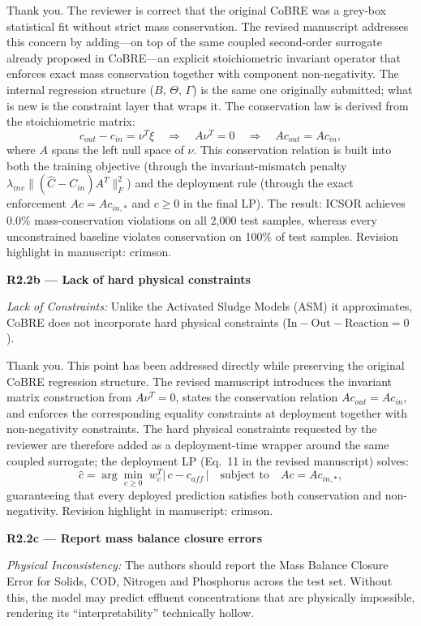 \documentclass[a4paper,11pt]{article}
\newcommand{\reviewlabel}[1]{\noindent\textbf{\textcolor{accentblue}{#1}}\par\medskip}
\newcommand{\revhighlight}[2]{\textcolor{#1}{Revision highlight in manuscript: #2.}}
\begin{document}
Thank you. The reviewer is correct that the original CoBRE was a grey-box statistical fit without strict mass conservation. The revised manuscript addresses this concern by adding---on top of the same coupled second-order surrogate already proposed in CoBRE---an explicit stoichiometric invariant operator that enforces exact mass conservation together with component non-negativity. The internal regression structure ($B$, $\Theta$, $\Gamma$) is the same one originally submitted; what is new is the constraint layer that wraps it. The conservation law is derived from the stoichiometric matrix:
\[
c_{out} - c_{in} = \nu^T \xi \quad\Longrightarrow\quad A\nu^T = 0 \quad\Longrightarrow\quad Ac_{out} = Ac_{in},
\]
where $A$ spans the left null space of $\nu$. This conservation relation is built into both the training objective (through the invariant-mismatch penalty $\lambda_{inv}\|(\widehat{C} - C_{in})A^T\|_F^2$) and the deployment rule (through the exact enforcement $Ac = Ac_{in,*}$ and $c \ge 0$ in the final LP). The result: ICSOR achieves 0.0\% mass-conservation violations on all 2,000 test samples, whereas every unconstrained baseline violates conservation on 100\% of test samples. \revhighlight{revRtwoTwo}{crimson}

\reviewlabel{R2.2b --- Lack of hard physical constraints}
\begin{reviewbox}
\textit{Lack of Constraints:} Unlike the Activated Sludge Models (ASM) it approximates, CoBRE does not incorporate hard physical constraints ($\mathrm{In} - \mathrm{Out} - \mathrm{Reaction} = 0$).
\end{reviewbox}

Thank you. This point has been addressed directly while preserving the original CoBRE regression structure. The revised manuscript introduces the invariant matrix construction from $A\nu^T = 0$, states the conservation relation $Ac_{out} = Ac_{in}$, and enforces the corresponding equality constraints at deployment together with non-negativity constraints. The hard physical constraints requested by the reviewer are therefore added as a deployment-time wrapper around the same coupled surrogate; the deployment LP (Eq.~11 in the revised manuscript) solves:
\[
\hat{c} = \arg\min_{c \ge 0} \; w_c^T |\,c - c_{aff}\,| \quad \text{subject to} \quad Ac = Ac_{in,*},
\]
guaranteeing that every deployed prediction satisfies both conservation and non-negativity. \revhighlight{revRtwoTwo}{crimson}

\reviewlabel{R2.2c --- Report mass balance closure errors}
\begin{reviewbox}
\textit{Physical Inconsistency:} The authors should report the Mass Balance Closure Error for Solids, COD, Nitrogen and Phosphorus across the test set. Without this, the model may predict effluent concentrations that are physically impossible, rendering its ``interpretability'' technically hollow.
\end{reviewbox}
\end{document}
